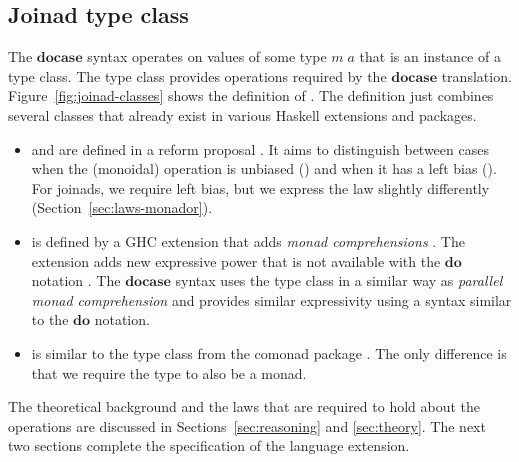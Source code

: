 \documentclass{sigplanconf}
\newcommand{\Varid}[1]{\mathit{#1}}
\begin{document}

\subsection{Joinad type class}
\label{sec:extension-typeclass}

The \ensuremath{\mathbf{docase}} syntax operates on values of some type \ensuremath{\Varid{m}\;\Varid{a}} that is an instance of a  
type class. The type class provides operations required by the \ensuremath{\mathbf{docase}} translation. 
Figure~\ref{fig:joinad-classes} shows the definition of . The definition just 
combines several classes that already exist in various Haskell extensions and packages. 

\begin{itemize}
\item {} and  are defined in a  reform proposal
\cite{monadplusreform}. It aims to distinguish between cases when the (monoidal) operation is 
unbiased () and when it has a left bias (). For joinads, we 
require left bias, but we express the law slightly differently (Section~\ref{sec:laws-monador}).

\item {} is defined by a GHC extension that adds \textit{monad comprehensions}
\cite{bringbackmc, comprefun}. The extension adds new expressive power that is not available with 
the \ensuremath{\mathbf{do}} notation \cite{parcomprefun}. The \ensuremath{\mathbf{docase}} syntax uses the  type class in 
a similar way as \textit{parallel monad comprehension} and provides similar expressivity using 
a syntax similar to the \ensuremath{\mathbf{do}} notation.

\item {} is similar to the  type class from the comonad 
package \cite{comonadpkg}. The only difference is that we require the type to also be a monad.

\end{itemize}
The theoretical background and the laws that are required to hold about the operations are discussed 
in Sections~\ref{sec:reasoning} and \ref{sec:theory}. The next 
two sections complete the specification of the language extension.
\end{document}
